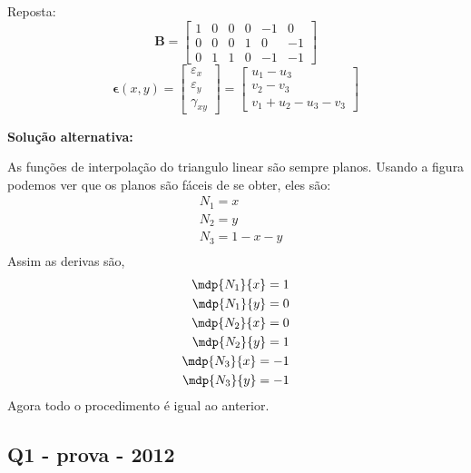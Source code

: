 \color{blue}
Reposta:
\begin{equation}
	\mathbf{B} = 
	\begin{bmatrix}
		1& 0   & 0 & 0 & -1 & 0\\
		0& 0  & 0 & 1 &  0 & -1\\
		0& 1  & 1 & 0 & -1 & -1
	\end{bmatrix}
\end{equation}
\begin{equation}
	\mathbf{\epsilon}(x, y) = 
	\begin{bmatrix}
		\varepsilon_x\\
		\varepsilon_y\\
		\gamma_{xy}	
	\end{bmatrix}
	= 
	\begin{bmatrix}
		u_1 - u_3\\
		v_2 - v_3\\
		v_1 + u_2 - u_3 - v_3
	\end{bmatrix}
\end{equation}
\color{black}


\textbf{Solução alternativa:}

As funções de interpolação do triangulo linear são sempre planos. Usando a figura podemos ver que os planos são fáceis de se obter, eles são:
%
\begin{equation}
	\begin{split}
		&N_1 = x\\ 
		&N_2 = y\\ 
		&N_3 = 1 - x - y\\ 
	\end{split}
\end{equation}
%
Assim as derivas são,
%
\begin{equation}
	\begin{split}
		\mdp{N_1}{x} = 1\\
		\mdp{N_1}{y} = 0\\
		\mdp{N_2}{x} = 0\\
		\mdp{N_2}{y} = 1\\
		\mdp{N_3}{x} = -1\\
		\mdp{N_3}{y} = -1
	\end{split}
\end{equation}
%
Agora todo o procedimento é igual ao anterior.

\subsection{Q1 - prova - 2012}

